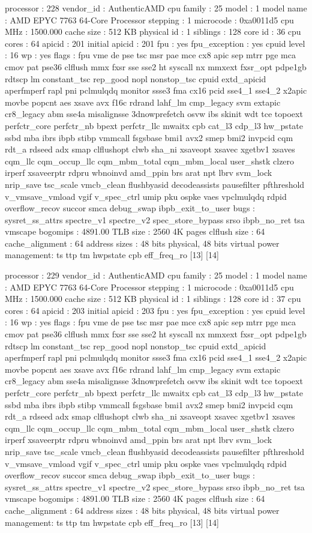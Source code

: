processor	: 228
vendor_id	: AuthenticAMD
cpu family	: 25
model		: 1
model name	: AMD EPYC 7763 64-Core Processor
stepping	: 1
microcode	: 0xa0011d5
cpu MHz		: 1500.000
cache size	: 512 KB
physical id	: 1
siblings	: 128
core id		: 36
cpu cores	: 64
apicid		: 201
initial apicid	: 201
fpu		: yes
fpu_exception	: yes
cpuid level	: 16
wp		: yes
flags		: fpu vme de pse tsc msr pae mce cx8 apic sep mtrr pge mca cmov pat pse36 clflush mmx fxsr sse sse2 ht syscall nx mmxext fxsr_opt pdpe1gb rdtscp lm constant_tsc rep_good nopl nonstop_tsc cpuid extd_apicid aperfmperf rapl pni pclmulqdq monitor ssse3 fma cx16 pcid sse4_1 sse4_2 x2apic movbe popcnt aes xsave avx f16c rdrand lahf_lm cmp_legacy svm extapic cr8_legacy abm sse4a misalignsse 3dnowprefetch osvw ibs skinit wdt tce topoext perfctr_core perfctr_nb bpext perfctr_llc mwaitx cpb cat_l3 cdp_l3 hw_pstate ssbd mba ibrs ibpb stibp vmmcall fsgsbase bmi1 avx2 smep bmi2 invpcid cqm rdt_a rdseed adx smap clflushopt clwb sha_ni xsaveopt xsavec xgetbv1 xsaves cqm_llc cqm_occup_llc cqm_mbm_total cqm_mbm_local user_shstk clzero irperf xsaveerptr rdpru wbnoinvd amd_ppin brs arat npt lbrv svm_lock nrip_save tsc_scale vmcb_clean flushbyasid decodeassists pausefilter pfthreshold v_vmsave_vmload vgif v_spec_ctrl umip pku ospke vaes vpclmulqdq rdpid overflow_recov succor smca debug_swap ibpb_exit_to_user
bugs		: sysret_ss_attrs spectre_v1 spectre_v2 spec_store_bypass srso ibpb_no_ret tsa vmscape
bogomips	: 4891.00
TLB size	: 2560 4K pages
clflush size	: 64
cache_alignment	: 64
address sizes	: 48 bits physical, 48 bits virtual
power management: ts ttp tm hwpstate cpb eff_freq_ro [13] [14]

processor	: 229
vendor_id	: AuthenticAMD
cpu family	: 25
model		: 1
model name	: AMD EPYC 7763 64-Core Processor
stepping	: 1
microcode	: 0xa0011d5
cpu MHz		: 1500.000
cache size	: 512 KB
physical id	: 1
siblings	: 128
core id		: 37
cpu cores	: 64
apicid		: 203
initial apicid	: 203
fpu		: yes
fpu_exception	: yes
cpuid level	: 16
wp		: yes
flags		: fpu vme de pse tsc msr pae mce cx8 apic sep mtrr pge mca cmov pat pse36 clflush mmx fxsr sse sse2 ht syscall nx mmxext fxsr_opt pdpe1gb rdtscp lm constant_tsc rep_good nopl nonstop_tsc cpuid extd_apicid aperfmperf rapl pni pclmulqdq monitor ssse3 fma cx16 pcid sse4_1 sse4_2 x2apic movbe popcnt aes xsave avx f16c rdrand lahf_lm cmp_legacy svm extapic cr8_legacy abm sse4a misalignsse 3dnowprefetch osvw ibs skinit wdt tce topoext perfctr_core perfctr_nb bpext perfctr_llc mwaitx cpb cat_l3 cdp_l3 hw_pstate ssbd mba ibrs ibpb stibp vmmcall fsgsbase bmi1 avx2 smep bmi2 invpcid cqm rdt_a rdseed adx smap clflushopt clwb sha_ni xsaveopt xsavec xgetbv1 xsaves cqm_llc cqm_occup_llc cqm_mbm_total cqm_mbm_local user_shstk clzero irperf xsaveerptr rdpru wbnoinvd amd_ppin brs arat npt lbrv svm_lock nrip_save tsc_scale vmcb_clean flushbyasid decodeassists pausefilter pfthreshold v_vmsave_vmload vgif v_spec_ctrl umip pku ospke vaes vpclmulqdq rdpid overflow_recov succor smca debug_swap ibpb_exit_to_user
bugs		: sysret_ss_attrs spectre_v1 spectre_v2 spec_store_bypass srso ibpb_no_ret tsa vmscape
bogomips	: 4891.00
TLB size	: 2560 4K pages
clflush size	: 64
cache_alignment	: 64
address sizes	: 48 bits physical, 48 bits virtual
power management: ts ttp tm hwpstate cpb eff_freq_ro [13] [14]

